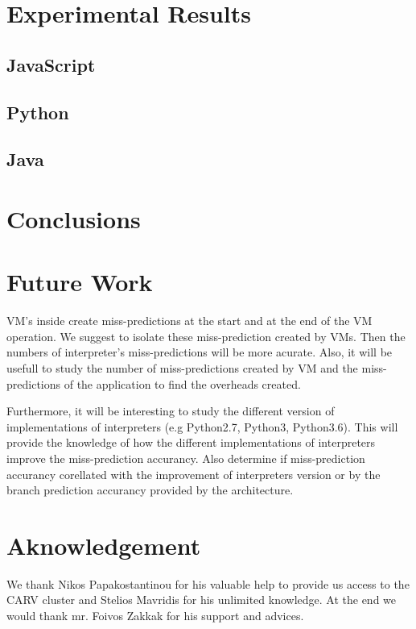 \documentclass[parskip=full, paper=a4, fontsize=12pt]{scrartcl}
\numberwithin{equation}{section}
\numberwithin{figure}{section}
\numberwithin{table}{section}
\begin{document}
\section{Experimental Results}
\subsection{JavaScript}

\subsection{Python}

\subsection{Java}

\section{Conclusions}



\section{Future Work}
VM's inside create miss-predictions at the start and at the end of the
VM operation.  We suggest to isolate these miss-prediction created by
VMs. Then the numbers of interpreter's miss-predictions will be more
acurate. Also, it will be usefull to study the number of
miss-predictions created by VM and the miss-predictions of the
application to find the overheads created.

Furthermore, it will be interesting to study the different version of
implementations of interpreters (e.g Python2.7, Python3, Python3.6).
This will provide the knowledge of how the different implementations
of interpreters improve the miss-prediction accurancy. Also determine
if miss-prediction accurancy corellated with the improvement of
interpreters version or by the branch prediction accurancy provided by
the architecture.

\section{Aknowledgement}
We thank Nikos Papakostantinou for his valuable help to provide us
access to the CARV cluster and Stelios Mavridis for his unlimited
knowledge. At the end we would thank mr. Foivos Zakkak for his support
and advices.

\newpage


\end{document}
